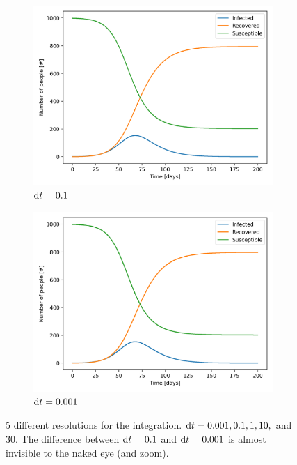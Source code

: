 \documentclass{article}
\begin{document}
\begin{figure}
  \begin{subfigure}{0.45\textwidth}
    \includegraphics[width=\linewidth]{./Images/SIR_plot_dt0_1.png}
    \caption{${\rm d}t=0.1$}
    \label{subfig:plot4}
  \end{subfigure}
  \begin{subfigure}{0.45\textwidth}
    \includegraphics[width=\linewidth]{./Images/SIR_plot_dt0_001.png}
    \caption{${\rm d}t=0.001$}
    \label{subfig:plot5}
  \end{subfigure}
  
  \caption{5 different resolutions for the integration. ${\rm d}t = 0.001, 0.1, 1, 10,$ and $30$. The difference between ${\rm d}t=0.1$ and ${\rm d}t = 0.001$ is almost invisible to the naked eye (and zoom).}
  \label{fig:subplots_two_rows}
\end{figure}
\end{document}
